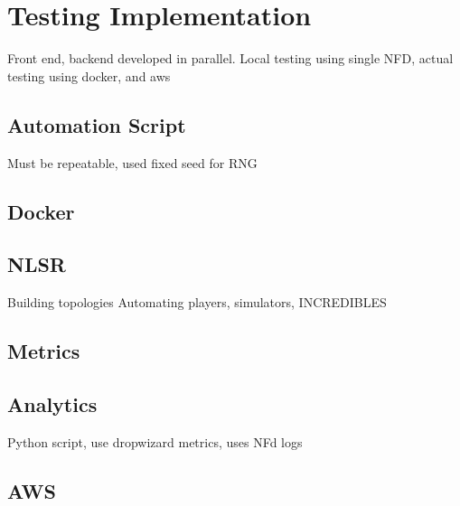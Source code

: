 \chapter{Testing Implementation}
Front end, backend developed in parallel. Local testing using single NFD, actual testing using docker, and aws

\section{Automation Script}
Must be repeatable, used fixed seed for RNG

\section{Docker}


\section{NLSR}
Building topologies
Automating players, simulators, INCREDIBLES

\section{Metrics}


\section{Analytics}
Python script, use dropwizard metrics, uses NFd logs


\section{AWS}


